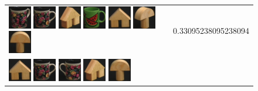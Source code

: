 \begin{figure}[tbp]
\begin{center}
\begin{tabular}{m{11cm} | m{3cm} |}
\includegraphics[width=1cm]{coil/beeld-63.eps}
\includegraphics[width=1cm]{coil/beeld-60.eps}
\includegraphics[width=1cm]{coil/beeld-45.eps}
\includegraphics[width=1cm]{coil/beeld-30.eps}
\includegraphics[width=1cm]{coil/beeld-42.eps}
\includegraphics[width=1cm]{coil/beeld-3.eps}
\includegraphics[width=1cm]{coil/beeld-1.eps}
& {\scriptsize 0.33095238095238094}
\\
\includegraphics[width=1cm]{coil/beeld-42.eps}
\includegraphics[width=1cm]{coil/beeld-60.eps}
\includegraphics[width=1cm]{coil/beeld-61.eps}
\includegraphics[width=1cm]{coil/beeld-45.eps}
\includegraphics[width=1cm]{coil/beeld-0.eps}

\end{tabular}
\end{center}
\end{figure}
